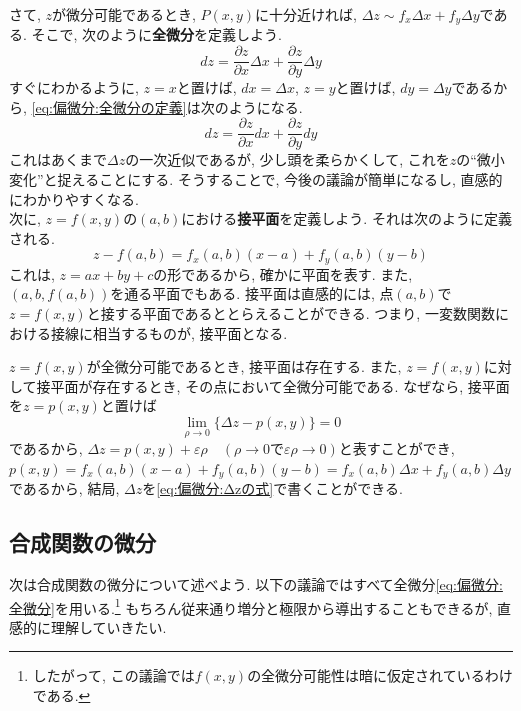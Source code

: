 \documentclass[a4j,dvipdfmx]{jsarticle}
\numberwithin{equation}{section}
\begin{document}
            \clearpage
            さて, $z$が微分可能であるとき, $P(x,y)$に十分近ければ, $\Delta z\sim f_x\Delta x+f_y\Delta y$である. そこで, 次のように\textbf{全微分}を定義しよう.
            \begin{equation}
                dz = \frac{\partial z}{\partial x}\Delta x + \frac{\partial z}{\partial y}\Delta y \label{eq:偏微分:全微分の定義}
            \end{equation}
            すぐにわかるように, $z=x$と置けば, $dx=\Delta x$, $z=y$と置けば, $dy=\Delta y$であるから, \eqref{eq:偏微分:全微分の定義}は次のようになる.
            \begin{equation}
                dz = \frac{\partial z}{\partial x}dx + \frac{\partial z}{\partial y}dy \label{eq:偏微分:全微分}
            \end{equation}
            これはあくまで$\Delta z$の一次近似であるが, 少し頭を柔らかくして, これを$z$の``微小変化''と捉えることにする. そうすることで, 今後の議論が簡単になるし, 直感的にわかりやすくなる.\\

            次に, $z=f(x,y)$の$(a,b)$における\textbf{接平面}を定義しよう. それは次のように定義される.
            \begin{equation}
                z-f(a,b)=f_{x}(a,b) (x-a) + f_{y}(a,b) (y-b) \label{eq:偏微分:接平面の定義}
            \end{equation}
            これは, $z=ax+by+c$の形であるから, 確かに平面を表す. また, $(a,b,f(a,b))$を通る平面でもある. 接平面は直感的には, 点$(a,b)$で$z=f(x,y)$と接する平面であるととらえることができる.
            つまり, 一変数関数における接線に相当するものが, 接平面となる. 

            $z=f(x,y)$が全微分可能であるとき, 接平面は存在する. また, $z=f(x,y)$に対して接平面が存在するとき, その点において全微分可能である. なぜなら, 接平面を$z=p(x,y)$と置けば
            \begin{equation*}
                \lim_{\rho \to 0}\{\Delta z - p(x,y)\} = 0
            \end{equation*}
            であるから, $\Delta z = p(x,y)+\varepsilon\rho\quad (\rho\to 0で\varepsilon\rho\to 0)$と表すことができ, $p(x,y)=f_{x}(a,b)(x-a)+f_{y}(a,b)(y-b)=f_{x}(a,b)\Delta x+f_{y}(a,b)\Delta y$であるから, 
            結局, $\Delta z$を\eqref{eq:偏微分:Δzの式}で書くことができる. 
        \clearpage
        \subsection{合成関数の微分}
            次は合成関数の微分について述べよう. 以下の議論ではすべて全微分\eqref{eq:偏微分:全微分}を用いる.\footnote{したがって, この議論では$f(x,y)$の全微分可能性は暗に仮定されているわけである.} もちろん従来通り増分と極限から導出することもできるが, 直感的に理解していきたい.
\end{document}

